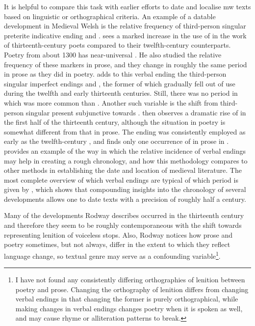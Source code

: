 It is helpful to compare this task with earlier efforts to date and localise \gls{mw} texts based on linguistic or orthographical criteria. An example of a datable development in Medieval Welsh is the relative frequency of third-person singular preterite indicative ending  and . \Textcite{Rod_Datable98} sees a marked increase in the use of  in the work of thirteenth-century poets compared to their twelfth-century counterparts. Poetry from about 1300 has near-universal . He also studied the relative frequency of these markers in prose, and they change in roughly the same period in prose as they did in poetry. \Textcite[68--71]{Rod_Two03} adds to this verbal ending the third-person singular imperfect endings  and \ei, the former of which gradually fell out of use during the twelfth and early thirteenth centuries. Still, there was no period in which  was more common than \ei. Another such variable is the shift from third-person singular present subjunctive  towards . \Textcite[71--73]{Rod_Two03} then observes a dramatic rise of  in the first half of the thirteenth century, although the situation in poetry is somewhat different from that in prose. The ending  was consistently employed as early as the twelfth-century , and \textcite[73]{Rod_Two03} finds only one occurrence of  in prose in . \Textcite{Rod_Where07} provides an example of the way in which the relative incidence of verbal endings may help in creating a rough chronology, and how this methodology compares to other methods in establishing the date and location of medieval literature. The most complete overview of which verbal endings are typical of which period is given by \textcite[166]{rodway_dating_2013}, which shows that compounding insights into the chronology of several developments allows one to date texts with a precision of roughly half a century.

Many of the developments Rodway describes occurred in the thirteenth century and therefore they seem to be roughly contemporaneous with the shift towards representing lenition of voiceless stops. Also, Rodway notices how prose and poetry sometimes, but not always, differ in the extent to which they reflect language change, so textual genre may serve as a confounding variable\footnote{I have not found any consistently differing orthographies of lenition between poetry and prose. Changing the orthography of lenition differs from changing verbal endings in that changing the former is purely orthographical, while making changes in verbal endings changes poetry when it is spoken as well, and may cause rhyme or alliteration patterns to break.}.

